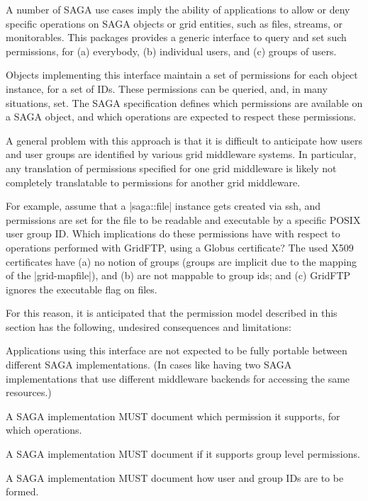  
 A number of SAGA use cases imply the ability of applications to
 allow or deny specific operations on SAGA objects or grid
 entities, such as files, streams, or monitorables.  This
 packages provides a generic interface to query and set such
 permissions, for (a) everybody, (b) individual users, and (c)
 groups of users.
 
 
 Objects implementing this interface maintain a set of
 permissions for each object instance, for a set of IDs.  These
 permissions can be queried, and, in many situations, set.  The
 SAGA specification defines which permissions are available on a
 SAGA object, and which operations are expected to respect these
 permissions.
 
 A general problem with this approach is that it is difficult to
 anticipate how users and user groups are identified by various
 grid middleware systems.  In particular, any translation of
 permissions specified for one grid middleware is likely not
 completely translatable to permissions for another grid
 middleware.  
 
 For example, assume that a |saga::file| instance gets created
 via ssh, and permissions are set for the file to be readable
 and executable by a specific POSIX user group ID.  Which
 implications do these permissions have with respect to operations
 performed with GridFTP, using a Globus certificate?  The
 used X509 certificates have (a) no notion of groups (groups are
 implicit due to the mapping of the |grid-mapfile|), and (b) are
 not mappable to group ids; and (c) GridFTP ignores the
 executable flag on files.
 
 For this reason, it is anticipated that the permission model
 described in this section has the following, undesired
 consequences and limitations:
 
 \begin{shortlist}
 
  \item Applications using this interface are not expected to be
  fully portable between different SAGA implementations.
  (In cases like having two SAGA implementations that use different
  middleware backends for accessing the same resources.)
 
  \item A SAGA implementation MUST document which permission it
  supports, for which operations.
 
  \item A SAGA implementation MUST document if it supports group
  level permissions.
 
  \item A SAGA implementation MUST document how user and group
  IDs are to be formed.
 
 \end{shortlist}
 
